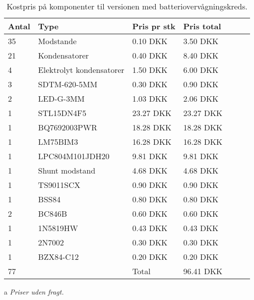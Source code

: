 \FloatBlock



\begin{table}[h!]
	\small
	\centering
	\begin{threeparttable}
		\begin{tabular}{ l l l l l l l }
			\toprule
			\multicolumn{1}{l}{\textbf{Antal}}        &
			\multicolumn{1}{l}{\textbf{Type}}         &
			\multicolumn{1}{l}{\textbf{Pris pr stk}}  &
			\multicolumn{1}{l}{\textbf{Pris total}}   \\ 
			\hline
			35 &  Modstande                 &  0.10 DKK   &  3.50 DKK  \\
			21 &  Kondensatorer             &  0.40 DKK   &  8.40 DKK  \\
			4  &  Elektrolyt kondensatorer  &  1.50 DKK   &  6.00 DKK  \\
			3  &  SDTM-620-5MM              &  0.30 DKK   &  0.90 DKK  \\
			2  &  LED-G-3MM                 &  1.03 DKK   &  2.06 DKK  \\
			1  &  STL15DN4F5                & 23.27 DKK   & 23.27 DKK  \\
			1  &  BQ7692003PWR              & 18.28 DKK   & 18.28 DKK  \\
			1  &  LM75BIM3                  & 16.28 DKK   & 16.28 DKK  \\
			1  &  LPC804M101JDH20           &  9.81 DKK   &  9.81 DKK  \\
			1  &  Shunt modstand            &  4.68 DKK   &  4.68 DKK  \\
			1  &  TS9011SCX                 &  0.90 DKK   &  0.90 DKK  \\
			1  &  BSS84                     &  0.80 DKK   &  0.80 DKK  \\
			2  &  BC846B                    &  0.60 DKK   &  0.60 DKK  \\
			1  &  1N5819HW                &  0.43 DKK   &  0.43 DKK  \\
			1  &  2N7002                    &  0.30 DKK   &  0.30 DKK  \\
			1  &  BZX84-C12                 &  0.20 DKK   &  0.20 DKK  \\  
			\hline
		   77  &                            & Total       & 96.41 DKK  \\  
			\hline
			\bottomrule
		\end{tabular}
		\begin{tablenotes}
			\item[a] \textit{Priser uden fragt.}
		\end{tablenotes}
		\caption{Kostpris på komponenter til versionen med batteriovervågningskreds.}
		\label{tab:pris_ic}
	\end{threeparttable}
\end{table} 
\FloatBlock

